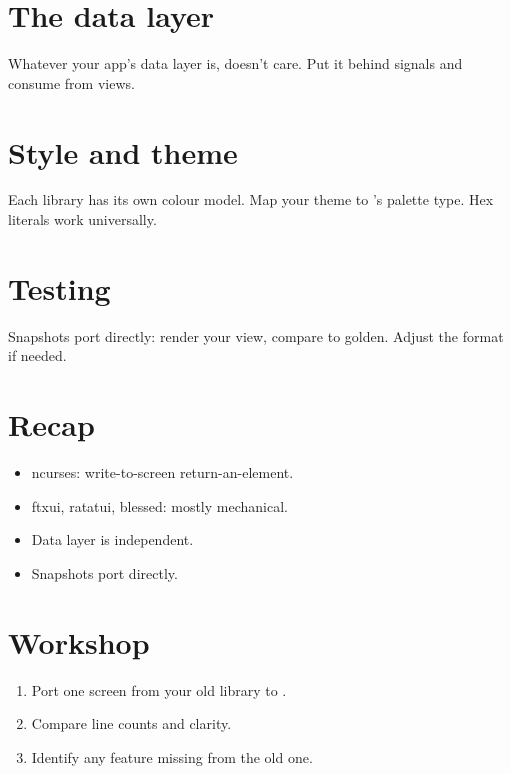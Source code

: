 \section{The data layer}

Whatever your app's data layer is, \maya{} doesn't care. Put
it behind signals and consume from views.

\section{Style and theme}

Each library has its own colour model. Map your theme to
\maya{}'s palette type. Hex literals work universally.

\section{Testing}

Snapshots port directly: render your view, compare to
golden. Adjust the format if needed.

\section{Recap}

\begin{recap}
\begin{itemize}[leftmargin=*]
  \item ncurses: write-to-screen \textrightarrow{}
    return-an-element.
  \item ftxui, ratatui, blessed: mostly mechanical.
  \item Data layer is independent.
  \item Snapshots port directly.
\end{itemize}
\end{recap}

\section*{Workshop}

\begin{enumerate}[leftmargin=*]
  \item Port one screen from your old library to \maya{}.
  \item Compare line counts and clarity.
  \item Identify any \maya{} feature missing from the old
    one.
\end{enumerate}
